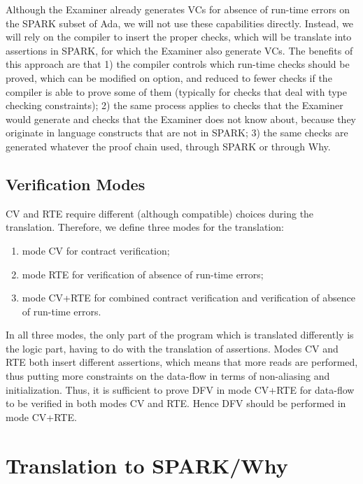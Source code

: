 \documentclass{article}
\begin{document}
Although the Examiner already generates VCs for absence of run-time errors on
the SPARK subset of Ada, we will not use these capabilities directly. Instead,
we will rely on the compiler to insert the proper checks, which will be
translate into assertions in SPARK, for which the Examiner also generate
VCs. The benefits of this approach are that 1) the compiler controls which
run-time checks should be proved, which can be modified on option, and reduced
to fewer checks if the compiler is able to prove some of them (typically for
checks that deal with type checking constraints); 2) the same process applies
to checks that the Examiner would generate and checks that the Examiner does
not know about, because they originate in language constructs that are not in
SPARK; 3) the same checks are generated whatever the proof chain used, through
SPARK or through Why.

\subsection{Verification Modes}

CV and RTE require different (although compatible) choices during the
translation.  Therefore, we define three modes for the translation:
\begin{enumerate}
\item mode CV for contract verification;
\item mode RTE for verification of absence of run-time errors;
\item mode CV+RTE for combined contract verification and verification of
  absence of run-time errors.
\end{enumerate}

In all three modes, the only part of the program which is translated
differently is the logic part, having to do with the translation of
assertions. Modes CV and RTE both insert different assertions, which means that
more reads are performed, thus putting more constraints on the data-flow in
terms of non-aliasing and initialization. Thus, it is sufficient to prove DFV
in mode CV+RTE for data-flow to be verified in both modes CV and RTE. Hence DFV
should be performed in mode CV+RTE.

\section{Translation to SPARK/Why}
\end{document}

